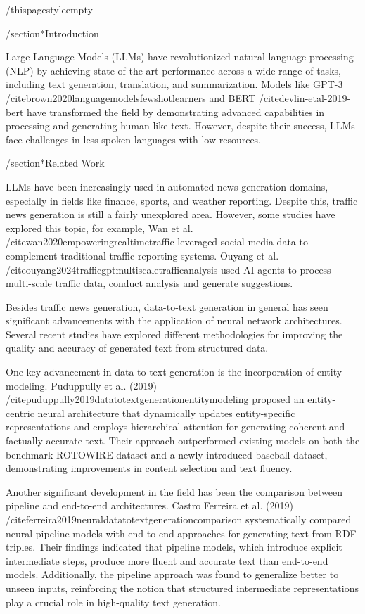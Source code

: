 /thispagestyle{empty} 


/section*{Introduction}

Large Language Models (LLMs) have revolutionized natural language processing (NLP) by achieving state-of-the-art performance across a wide range of tasks, including text generation, translation, and summarization. Models like GPT-3 /cite{brown2020languagemodelsfewshotlearners} and BERT /cite{devlin-etal-2019-bert} have transformed the field by demonstrating advanced capabilities in processing and generating human-like text. However, despite their success, LLMs face challenges in less spoken languages with low resources.

/section*{Related Work}

LLMs have been increasingly used in automated news generation domains, especially in fields like finance, sports, and weather reporting. Despite this, traffic news generation is still a fairly unexplored area. However, some studies have explored this topic, for example, Wan et al. /cite{wan2020empoweringrealtimetraffic} leveraged social media data to complement traditional traffic reporting systems. Ouyang et al. /cite{ouyang2024trafficgptmultiscaletrafficanalysis} used AI agents to process multi-scale traffic data, conduct analysis and generate suggestions.

Besides traffic news generation, data-to-text generation in general has seen significant advancements with the application of neural network architectures. Several recent studies have explored different methodologies for improving the quality and accuracy of generated text from structured data.

One key advancement in data-to-text generation is the incorporation of entity modeling. Puduppully et al. (2019) /cite{puduppully2019datatotextgenerationentitymodeling} proposed an entity-centric neural architecture that dynamically updates entity-specific representations and employs hierarchical attention for generating coherent and factually accurate text. Their approach outperformed existing models on both the benchmark ROTOWIRE dataset and a newly introduced baseball dataset, demonstrating improvements in content selection and text fluency.

Another significant development in the field has been the comparison between pipeline and end-to-end architectures. Castro Ferreira et al. (2019) /cite{ferreira2019neuraldatatotextgenerationcomparison} systematically compared neural pipeline models with end-to-end approaches for generating text from RDF triples. Their findings indicated that pipeline models, which introduce explicit intermediate steps, produce more fluent and accurate text than end-to-end models. Additionally, the pipeline approach was found to generalize better to unseen inputs, reinforcing the notion that structured intermediate representations play a crucial role in high-quality text generation.

